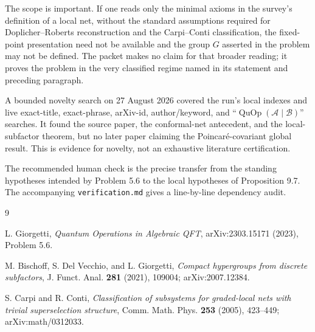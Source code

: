 \documentclass[11pt]{article}
\newcommand{\A}{\mathcal A}
\newcommand{\Bnet}{\mathcal B}
\newcommand{\QuOp}{\operatorname{QuOp}}
\begin{document}
The scope is important.  If one reads only the minimal axioms in the survey's
definition of a local net, without the standard assumptions required for
Doplicher--Roberts reconstruction and the Carpi--Conti classification, the
fixed-point presentation need not be available and the group $G$ asserted in
the problem may not be defined.  The packet makes no claim for that broader
reading; it proves the problem in the very classified regime named in its
statement and preceding paragraph.

A bounded novelty search on 27 August 2026 covered the run's local indexes and
live exact-title, exact-phrase, arXiv-id, author/keyword, and
``$\QuOp(\A\mid\Bnet)$'' searches.  It found the source paper, the conformal-net
antecedent, and the local-subfactor theorem, but no later paper claiming the
Poincar\'e-covariant global result.  This is evidence for novelty, not an
exhaustive literature certification.

The recommended human check is the precise transfer from the standing
hypotheses intended by Problem 5.6 to the local hypotheses of Proposition 9.7.
The accompanying \texttt{verification.md} gives a line-by-line dependency
audit.

\begin{thebibliography}{9}

L. Giorgetti,
\emph{Quantum Operations in Algebraic QFT},
arXiv:2303.15171 (2023), Problem 5.6.

M. Bischoff, S. Del Vecchio, and L. Giorgetti,
\emph{Compact hypergroups from discrete subfactors},
J. Funct. Anal. \textbf{281} (2021), 109004;
arXiv:2007.12384.

S. Carpi and R. Conti,
\emph{Classification of subsystems for graded-local nets with trivial
superselection structure},
Comm. Math. Phys. \textbf{253} (2005), 423--449;
arXiv:math/0312033.

\end{thebibliography}
\end{document}
